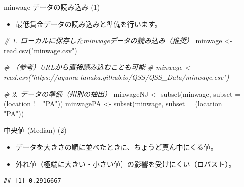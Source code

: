 \documentclass[
  ignorenonframetext,
]{beamer}
\newenvironment{Shaded}{\begin{snugshade}}{\end{snugshade}}
\newcommand{\AttributeTok}[1]{\textcolor[rgb]{0.77,0.63,0.00}{#1}}
\newcommand{\CommentTok}[1]{\textcolor[rgb]{0.56,0.35,0.01}{\textit{#1}}}
\newcommand{\ConstantTok}[1]{\textcolor[rgb]{0.00,0.00,0.00}{#1}}
\newcommand{\FunctionTok}[1]{\textcolor[rgb]{0.00,0.00,0.00}{#1}}
\newcommand{\NormalTok}[1]{#1}
\newcommand{\OtherTok}[1]{\textcolor[rgb]{0.56,0.35,0.01}{#1}}
\newcommand{\SpecialCharTok}[1]{\textcolor[rgb]{0.00,0.00,0.00}{#1}}
\newcommand{\StringTok}[1]{\textcolor[rgb]{0.31,0.60,0.02}{#1}}
\providecommand{\tightlist}{%
  \setlength{\itemsep}{0pt}\setlength{\parskip}{0pt}}
\begin{document}
\begin{frame}[fragile]{minwage データの読み込み (1)}
\protect\hypertarget{minwage-ux30c7ux30fcux30bfux306eux8aadux307fux8fbcux307f-1}{}
\begin{itemize}
\tightlist
\item
  最低賃金データの読み込みと準備を行います。
\end{itemize}

\scriptsize

\begin{Shaded}
\begin{Highlighting}[]
\CommentTok{\# 1. ローカルに保存したminwageデータの読み込み（推奨）}
\NormalTok{minwage }\OtherTok{\textless{}{-}} \FunctionTok{read.csv}\NormalTok{(}\StringTok{"minwage.csv"}\NormalTok{)}

\CommentTok{\# （参考）URLから直接読み込むことも可能}
\CommentTok{\# minwage \textless{}{-} read.csv("https://ayumu{-}tanaka.github.io/QSS/QSS\_Data/minwage.csv")}

\CommentTok{\# 2. データの準備（州別の抽出）}
\NormalTok{minwageNJ }\OtherTok{\textless{}{-}} \FunctionTok{subset}\NormalTok{(minwage, }\AttributeTok{subset =}\NormalTok{ (location }\SpecialCharTok{!=} \StringTok{"PA"}\NormalTok{))}
\NormalTok{minwagePA }\OtherTok{\textless{}{-}} \FunctionTok{subset}\NormalTok{(minwage, }\AttributeTok{subset =}\NormalTok{ (location }\SpecialCharTok{==} \StringTok{"PA"}\NormalTok{))}
\end{Highlighting}
\end{Shaded}

\normalsize
\end{frame}

\begin{frame}[fragile]{中央値 (Median) (2)}
\protect\hypertarget{ux4e2dux592eux5024-median-2}{}
\begin{itemize}
\tightlist
\item
  データを大きさの順に並べたときに、ちょうど真ん中にくる値。
\item
  外れ値（極端に大きい・小さい値）の影響を受けにくい（ロバスト）。
\end{itemize}

\scriptsize

\begin{Shaded}
\end{Shaded}

\begin{verbatim}
## [1] 0.2916667
\end{verbatim}

\normalsize
\end{frame}
\end{document}
